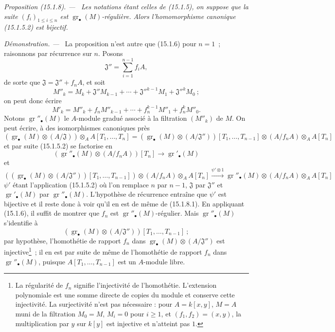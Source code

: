 \documentclass[10pt,oneside]{book}
\makeatletter
\newcommand{\gr}{\operatorname{gr}}
\newcommand{\setmanualcurrentlabel}[1]{\def\@currentlabel{#1}}
\newenvironment{proposition}[1][]{%
  \setmanualcurrentlabel{#1}\par\medskip\noindent\itshape Proposition (#1). ---\ }{\par}
\newenvironment{proof}{%
  \par\medskip\noindent\textit{Démonstration. ---\ }}{\par}
\makeatother
\begin{document}
\begin{proposition}[15.1.8]
\label{0.15.1.8-fr}
Les notations étant celles de (15.1.5), on suppose que la suite
$(f_i)_{1\leq i\leq n}$ est $\gr_\bullet(M)$-régulière. Alors
l'homomorphisme canonique (15.1.5.2) est bijectif.
\end{proposition}

\begin{proof}
La proposition n'est autre que (15.1.6) pour $n=1$~; raisonnons par récurrence
sur $n$. Posons
\[
  \mathfrak{J}''=\sum_{i=1}^{n-1}f_iA,
\]
de sorte que $\mathfrak{J}=\mathfrak{J}''+f_nA$, et soit
\[
  M''_k=M_k+\mathfrak{J}''M_{k-1}+\cdots+
  \mathfrak{J}''^{k-1}M_1+\mathfrak{J}''^kM_0~;
\]
on peut donc écrire
\[
  M'_k=M''_k+f_nM''_{k-1}+\cdots+f_n^{k-1}M''_1+f_n^kM''_0.
\]
Notons $\gr''_\bullet(M)$ le $A$-module gradué associé à la filtration
$(M''_k)$ de $M$. On peut écrire, à des isomorphismes canoniques près
\[
  (\gr_\bullet(M)\otimes(A/\mathfrak{J}))\otimes_A A[T_1,\ldots,T_n]
  =
  (\gr_\bullet(M)\otimes(A/\mathfrak{J}''))[T_1,\ldots,T_{n-1}]
  \otimes(A/f_nA)\otimes_A A[T_n]
\]
et par suite (15.1.5.2) se factorise en
\[
  (\gr''_\bullet(M)\otimes(A/f_nA))[T_n]\longrightarrow\gr'_\bullet(M)
  \tag{15.1.8.1}\label{0.15.1.8.1-fr}
\]
et
\[
  ((\gr_\bullet(M)\otimes(A/\mathfrak{J}''))[T_1,\ldots,T_{n-1}])
  \otimes(A/f_nA)\otimes_A A[T_n]
  \xrightarrow{\psi'\otimes1}
  \gr''_\bullet(M)\otimes(A/f_nA)\otimes_A A[T_n]
\]
$\psi'$ étant l'application (15.1.5.2) où l'on remplace $n$ par $n-1$,
$\mathfrak{J}$ par $\mathfrak{J}''$ et $\gr'_\bullet(M)$ par
$\gr''_\bullet(M)$. L'hypothèse de récurrence entraîne que $\psi'$ est
bijective et il reste donc à voir qu'il en est de même de (15.1.8.1). En
appliquant (15.1.6), il suffit de montrer que $f_n$ est
$\gr''_\bullet(M)$-régulier. Mais $\gr''_\bullet(M)$ s'identifie à
\[
  (\gr_\bullet(M)\otimes(A/\mathfrak{J}''))
  [T_1,\ldots,T_{n-1}]~;
\]
par hypothèse, l'homothétie de rapport $f_n$ dans
$\gr_\bullet(M)\otimes(A/\mathfrak{J}'')$ est injective\footnote{La régularité de $f_n$ signifie l'injectivité de l'homothétie. L'extension polynomiale est une somme directe de copies du module et conserve cette injectivité. La surjectivité n'est pas nécessaire : pour $A=k[x,y]$, $M=A$ muni de la filtration $M_0=M$, $M_i=0$ pour $i\geq1$, et $(f_1,f_2)=(x,y)$, la multiplication par $y$ sur $k[y]$ est injective et n'atteint pas $1$.}~; il en est par suite
de même de l'homothétie de rapport $f_n$ dans $\gr''_\bullet(M)$, puisque
$A[T_1,\ldots,T_{n-1}]$ est un $A$-module libre.
\end{proof}
\end{document}
